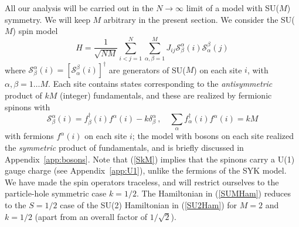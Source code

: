 \documentclass[aps,prx,preprint,onecolumn,citeautoscript,superscriptaddress,nofootinbib,
eqsecnum]{revtex4}
\newcommand{\beq}{\begin{equation}}
\newcommand{\eeq}{\end{equation}}
\begin{document}
All our analysis will be carried out in the $N \rightarrow \infty$ limit of a model with SU($M$) symmetry. We will keep $M$ arbitrary in the present section.
We consider the SU($M$) spin model
\beq
H = \frac{1}{\sqrt{NM}} \sum_{i < j = 1}^N \sum_{\alpha,\beta=1}^M J_{ij} \mathcal{S}_\beta^\alpha (i) \mathcal{S}_\alpha^\beta (j) \label{SUMHam}
\eeq
where $\mathcal{S}_\beta^\alpha (i) = [\mathcal{S}_\alpha^\beta (i)]^\dagger$ are generators of SU($M$) on each site $i$, with $\alpha, \beta = 1 \ldots M$. Each site contains states corresponding to the {\it antisymmetric\/} product of $k M$ (integer) fundamentals, and these are realized by fermionic spinons with
\beq
\mathcal{S}_{\beta}^\alpha (i) = f_\beta^\dagger (i) f^\alpha (i) - k \delta^{\alpha}_{\beta} \,,\quad \sum_\alpha  f_\alpha^\dagger (i) f^\alpha (i) = k M \label{SkM}
\eeq
with fermions $f^\alpha (i)$ on each site $i$; the model with bosons on each site realized the {\it symmetric\/} product of fundamentals, and is briefly discussed in Appendix~\ref{app:bosons}. Note that (\ref{SkM}) implies that the spinons carry a U(1) gauge charge (see Appendix~\ref{app:U1}), unlike the fermions of the SYK model. We have made the spin operators traceless, and will restrict ourselves to the particle-hole symmetric case $k=1/2$. The Hamiltonian in (\ref{SUMHam}) reduces to the $S=1/2$ case of the SU(2) Hamiltonian in (\ref{SU2Ham}) for $M=2$ and $k=1/2$ (apart from an overall factor of $1/\sqrt{2}$).
\end{document}

